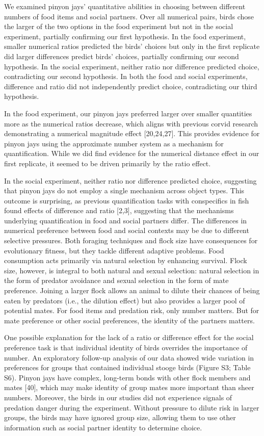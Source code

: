 \documentclass[
  ,doc,floatsintext]{apa6}
\begin{document}
We examined pinyon jays' quantitative abilities in choosing between different numbers of food items and social partners. Over all numerical pairs, birds chose the larger of the two options in the food experiment but not in the social experiment, partially confirming our first hypothesis. In the food experiment, smaller numerical ratios predicted the birds' choices but only in the first replicate did larger differences predict birds' choices, partially confirming our second hypothesis. In the social experiment, neither ratio nor difference predicted choice, contradicting our second hypothesis. In both the food and social experiments, difference and ratio did not independently predict choice, contradicting our third hypothesis.

In the food experiment, our pinyon jays preferred larger over smaller quantities more as the numerical ratios decrease, which aligns with previous corvid research demonstrating a numerical magnitude effect {[}20,24,27{]}. This provides evidence for pinyon jays using the approximate number system as a mechanism for quantification. While we did find evidence for the numerical distance effect in our first replicate, it seemed to be driven primarily by the ratio effect.

In the social experiment, neither ratio nor difference predicted choice, suggesting that pinyon jays do not employ a single mechanism across object types. This outcome is surprising, as previous quantification tasks with conspecifics in fish found effects of difference and ratio {[}2,3{]}, suggesting that the mechanisms underlying quantification in food and social partners differ. The differences in numerical preference between food and social contexts may be due to different selective pressures. Both foraging techniques and flock size have consequences for evolutionary fitness, but they tackle different adaptive problems. Food consumption acts primarily via natural selection by enhancing survival. Flock size, however, is integral to both natural and sexual selection: natural selection in the form of predator avoidance and sexual selection in the form of mate preference. Joining a larger flock allows an animal to dilute their chances of being eaten by predators (i.e., the dilution effect) but also provides a larger pool of potential mates. For food items and predation risk, only number matters. But for mate preference or other social preferences, the identity of the partners matters.

One possible explanation for the lack of a ratio or difference effect for the social preference task is that individual identity of birds overrides the importance of number. An exploratory follow-up analysis of our data showed wide variation in preferences for groups that contained individual stooge birds (Figure S3; Table S6). Pinyon jays have complex, long-term bonds with other flock members and mates {[}40{]}, which may make identity of group mates more important than sheer numbers. Moreover, the birds in our studies did not experience signals of predation danger during the experiment. Without pressure to dilute risk in larger groups, the birds may have ignored group size, allowing them to use other information such as social partner identity to determine choice.
\end{document}
